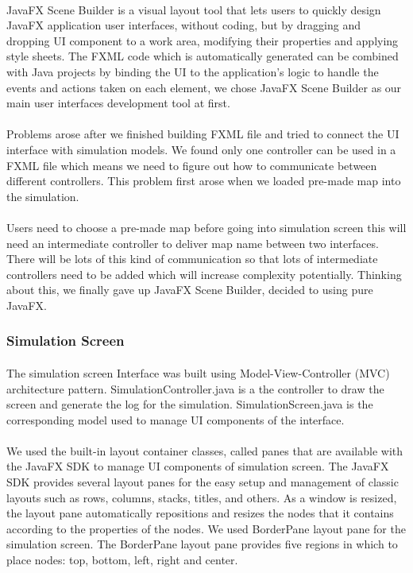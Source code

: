 \documentclass[a4paper,11pt,titlepage]{article}
\begin{document}
\paragraph{}
JavaFX Scene Builder is a visual layout tool that lets users to quickly design JavaFX application user interfaces, without coding, but by dragging and dropping UI component to a work area, modifying their properties and applying style sheets. The FXML code which is automatically generated can be combined with Java projects by binding the UI to the application's logic to handle the events and actions taken on each element, we chose JavaFX Scene Builder as our main user interfaces development tool at first.
\paragraph{}
Problems arose after we finished building FXML file and  tried to connect the UI interface with simulation models. We found only one controller can be used in a FXML file which means we need to figure out how to communicate between different controllers. This problem first arose when we loaded pre-made map into the simulation. 
\paragraph{}
Users need to choose a pre-made map before going into simulation screen this will need an intermediate controller to deliver map name between two interfaces. There will be lots of this kind of communication so that lots of intermediate controllers need to be added which will increase complexity potentially. Thinking about this, we finally gave up JavaFX Scene Builder, decided to using pure JavaFX.

\subsubsection{Simulation Screen}
\paragraph{}
The simulation screen Interface was built using Model-View-Controller (MVC) architecture pattern. SimulationController.java is a the controller to draw the screen and generate the log for the simulation. SimulationScreen.java is the corresponding model used to manage UI components of the interface. 
\paragraph{}
We used the built-in layout container classes, called panes that are available with the JavaFX SDK to manage UI components of simulation screen. The JavaFX SDK provides several layout panes for the easy setup and management of classic layouts such as rows, columns, stacks, titles, and others. As a window is resized, the layout pane automatically repositions and resizes the nodes that it contains according to the properties of the nodes. We used BorderPane layout pane for the simulation screen. The BorderPane layout pane provides five regions in which to place nodes: top, bottom, left, right and center. 
\end{document}
